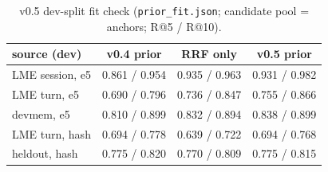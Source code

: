 \documentclass[10pt,twocolumn]{article}
\newcommand{\code}[1]{\texttt{\small #1}}
\begin{document}
\begin{table}[H]
\centering\small
\caption{v0.5 dev-split fit check (\code{prior\_fit.json}; candidate pool = anchors; R@5 / R@10).}
\label{tab:fit}
\begin{tabular}{@{}lccc@{}}
\toprule
source (dev) & v0.4 prior & RRF only & v0.5 prior \\
\midrule
LME session, e5 & 0.861 / 0.954 & 0.935 / 0.963 & 0.931 / 0.982 \\
LME turn, e5 & 0.690 / 0.796 & 0.736 / 0.847 & 0.755 / 0.866 \\
devmem, e5 & 0.810 / 0.899 & 0.832 / 0.894 & 0.838 / 0.899 \\
LME turn, hash & 0.694 / 0.778 & 0.639 / 0.722 & 0.694 / 0.768 \\
heldout, hash & 0.775 / 0.820 & 0.770 / 0.809 & 0.775 / 0.815 \\
\bottomrule
\end{tabular}
\end{table}
\end{document}
